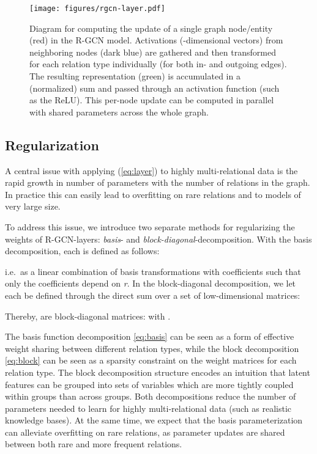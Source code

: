 \documentclass[letterpaper]{article} \usepackage{aaai18}  \usepackage{times}  \usepackage{helvet}  \usepackage{courier}  \usepackage{url}  \usepackage{graphicx}  \frenchspacing
\begin{document}
\begin{figure}[t!]
        \centering
    \texttt{[image: figures/rgcn-layer.pdf]}
    \label{fig:model-a}
    \caption{Diagram for computing the update of a single graph node/entity (red) in the R-GCN model. Activations (-dimensional  vectors) from neighboring nodes (dark blue) are gathered and then transformed for each relation type individually (for both in- and outgoing edges). The resulting representation (green) is accumulated in a (normalized) sum and passed through an activation function (such as the ReLU). This per-node update can be computed in parallel with shared parameters across the whole graph.}
    \label{fig:model}
\end{figure}

\subsection{Regularization}
A central issue with applying (\ref{eq:layer}) to highly multi-relational data is the rapid growth in number of parameters with the number of relations in the graph. In practice this can easily lead to overfitting on rare relations and to models of very large size.

To address this issue, we introduce two separate methods for regularizing the weights of R-GCN-layers: \textit{basis}- and \textit{block-diagonal}-decomposition. With the basis decomposition, each  is defined as follows:

i.e.~as a linear combination of basis transformations  with coefficients  such that only the coefficients depend on \textit{r}. In the block-diagonal decomposition, we let each  be defined through the direct sum over a set of low-dimensional matrices:

Thereby,  are block-diagonal matrices:
 with .

The basis function decomposition \eqref{eq:basis} can be seen as a form of effective weight sharing between different relation types, while the block decomposition \eqref{eq:block} can be seen as a sparsity constraint on the weight matrices for each relation type. The block decomposition structure encodes an intuition that latent features can be grouped into sets of variables which are more tightly coupled within groups than across groups.
Both decompositions reduce the number of parameters needed to learn for highly multi-relational data (such as realistic knowledge bases). At the same time, we expect that the basis parameterization can alleviate overfitting on rare relations, as parameter updates are shared between both rare and more frequent relations.
\end{document}
